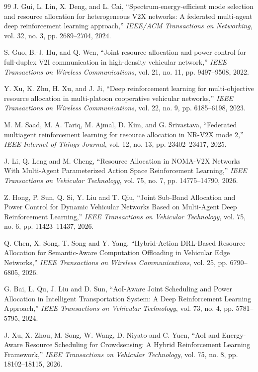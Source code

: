 \documentclass[journal]{IEEEtran}
\begin{document}
\begin{thebibliography}{99}
 J. Gui, L. Lin, X. Deng, and L. Cai, ``Spectrum-energy-efficient mode selection and resource allocation for heterogeneous V2X networks: A federated multi-agent deep reinforcement learning approach,'' \emph{IEEE/ACM Transactions on Networking}, vol. 32, no. 3, pp. 2689--2704, 2024.

 S. Guo, B.-J. Hu, and Q. Wen, ``Joint resource allocation and power control for full-duplex V2I communication in high-density vehicular network,'' \emph{IEEE Transactions on Wireless Communications}, vol. 21, no. 11, pp. 9497--9508, 2022.

 Y. Xu, K. Zhu, H. Xu, and J. Ji, ``Deep reinforcement learning for multi-objective resource allocation in multi-platoon cooperative vehicular networks,'' \emph{IEEE Transactions on Wireless Communications}, vol. 22, no. 9, pp. 6185--6198, 2023.

 M. M. Saad, M. A. Tariq, M. Ajmal, D. Kim, and G. Srivastava, ``Federated multiagent reinforcement learning for resource allocation in NR-V2X mode 2,'' \emph{IEEE Internet of Things Journal}, vol. 12, no. 13, pp. 23402--23417, 2025.

 J. Li, Q. Leng and M. Cheng, ``Resource Allocation in NOMA-V2X Networks With Multi-Agent Parameterized Action Space Reinforcement Learning,'' \emph{IEEE Transactions on Vehicular Technology}, vol. 75, no. 7, pp. 14775--14790, 2026.

 Z. Hong, P. Sun, Q. Si, Y. Liu and T. Qiu, ``Joint Sub-Band Allocation and Power Control for Dynamic Vehicular Networks Based on Multi-Agent Deep Reinforcement Learning,'' \emph{IEEE Transactions on Vehicular Technology}, vol. 75, no. 6, pp. 11423--11437, 2026.

 Q. Chen, X. Song, T. Song and Y. Yang, ``Hybrid-Action DRL-Based Resource Allocation for Semantic-Aware Computation Offloading in Vehicular Edge Networks,'' \emph{IEEE Transactions on Wireless Communications}, vol. 25, pp. 6790--6805, 2026.

 G. Bai, L. Qu, J. Liu and D. Sun, ``AoI-Aware Joint Scheduling and Power Allocation in Intelligent Transportation System: A Deep Reinforcement Learning Approach,'' \emph{IEEE Transactions on Vehicular Technology}, vol. 73, no. 4, pp. 5781--5795, 2024.

 J. Xu, X. Zhou, M. Song, W. Wang, D. Niyato and C. Yuen, ``AoI and Energy-Aware Resource Scheduling for Crowdsensing: A Hybrid Reinforcement Learning Framework,'' \emph{IEEE Transactions on Vehicular Technology}, vol. 75, no. 8, pp. 18102--18115, 2026.


\end{thebibliography}
\end{document}
